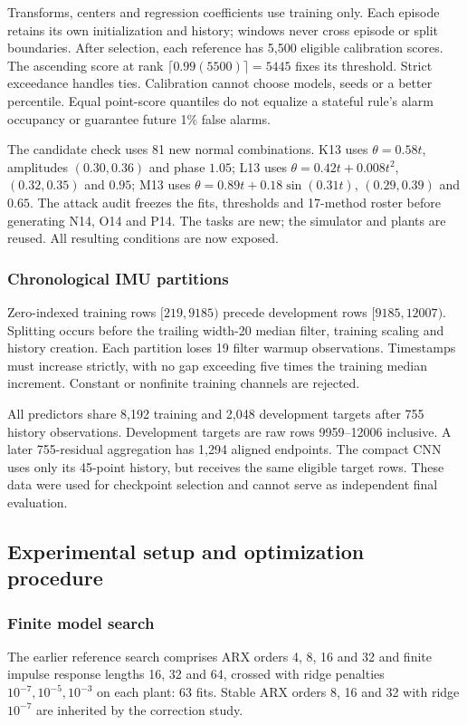 Transforms, centers and regression coefficients use training only. Each episode retains its own initialization and history; windows never cross episode or split boundaries. After selection, each reference has 5,500 eligible calibration scores. The ascending score at rank $\lceil0.99(5500)\rceil=5445$ fixes its threshold. Strict exceedance handles ties. Calibration cannot choose models, seeds or a better percentile. Equal point-score quantiles do not equalize a stateful rule's alarm occupancy or guarantee future 1\% false alarms.

The candidate check uses 81 new normal combinations. K13 uses $\theta=0.58t$, amplitudes $(0.30,0.36)$ and phase $1.05$; L13 uses $\theta=0.42t+0.008t^2$, $(0.32,0.35)$ and $0.95$; M13 uses $\theta=0.89t+0.18\sin(0.31t)$, $(0.29,0.39)$ and $0.65$. The attack audit freezes the fits, thresholds and 17-method roster before generating N14, O14 and P14. The tasks are new; the simulator and plants are reused. All resulting conditions are now exposed.

\subsubsection{Chronological IMU partitions}
Zero-indexed training rows $[219,9185)$ precede development rows $[9185,12007)$. Splitting occurs before the trailing width-20 median filter, training scaling and history creation. Each partition loses 19 filter warmup observations. Timestamps must increase strictly, with no gap exceeding five times the training median increment. Constant or nonfinite training channels are rejected.

All predictors share 8,192 training and 2,048 development targets after 755 history observations. Development targets are raw rows 9959--12006 inclusive. A later 755-residual aggregation has 1,294 aligned endpoints. The compact CNN uses only its 45-point history, but receives the same eligible target rows. These data were used for checkpoint selection and cannot serve as independent final evaluation.

\subsection{Experimental setup and optimization procedure}
\subsubsection{Finite model search}
The earlier reference search comprises ARX orders 4, 8, 16 and 32 and finite impulse response lengths 16, 32 and 64, crossed with ridge penalties $10^{-7},10^{-5},10^{-3}$ on each plant: 63 fits. Stable ARX orders 8, 16 and 32 with ridge $10^{-7}$ are inherited by the correction study.

